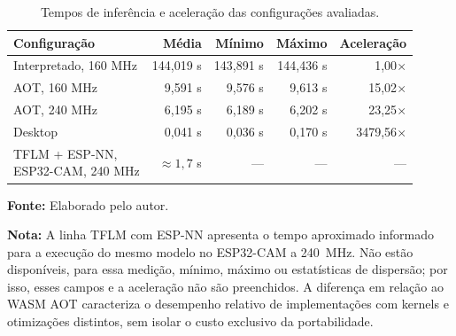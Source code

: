 \begin{table}[H]
\centering
\caption{Tempos de inferência e aceleração das configurações avaliadas.}
\label{tab:tempos-inferencia-aceleracao}

\begin{tabular}{
l
r
r
r
r
}
\toprule
\textbf{Configuração} &
\textbf{Média} &
\textbf{Mínimo} &
\textbf{Máximo} &
\textbf{Aceleração} \\
\midrule

Interpretado, 160 MHz &
144,019 s &
143,891 s &
144,436 s &
1,00$\times$ \\

\addlinespace

AOT, 160 MHz &
9,591 s &
9,576 s &
9,613 s &
15,02$\times$ \\

\addlinespace

AOT, 240 MHz &
6,195 s &
6,189 s &
6,202 s &
23,25$\times$ \\

\addlinespace

Desktop &
0,041 s &
0,036 s &
0,170 s &
3479,56$\times$ \\

\addlinespace

\shortstack[l]{TFLM + ESP-NN,\\ESP32-CAM, 240 MHz} &
$\approx 1{,}7$ s &
--- &
--- &
--- \\

\bottomrule
\end{tabular}

\vspace{0.3cm}

\small \textbf{Fonte:} Elaborado pelo autor.

\par\smallskip
\begin{minipage}{\textwidth}
\small \textbf{Nota:} A linha TFLM com ESP-NN apresenta o tempo aproximado informado para a execução do mesmo modelo no ESP32-CAM a 240~MHz. Não estão disponíveis, para essa medição, mínimo, máximo ou estatísticas de dispersão; por isso, esses campos e a aceleração não são preenchidos. A diferença em relação ao WASM AOT caracteriza o desempenho relativo de implementações com kernels e otimizações distintos, sem isolar o custo exclusivo da portabilidade.
\end{minipage}

\end{table}

